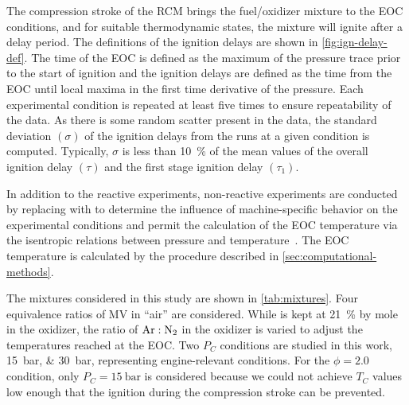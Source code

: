 \documentclass[letterpaper, review, sort&compress]{elsarticle}
\providecommand{\DIFadd}[1]{{\protect\color{blue}\uwave{#1}}} %
\providecommand{\DIFaddbegin}{} %
\providecommand{\DIFaddend}{} %
\newcommand{\DIFaddincludegraphics}[2][]{{\color{blue}\fbox{\DIFOincludegraphics[#1]{#2}}}} %
\DeclareRobustCommand{\DIFaddbegin}{\DIFOaddbegin \let\includegraphics\DIFaddincludegraphics} %
\DeclareRobustCommand{\DIFaddend}{\DIFOaddend \let\includegraphics\DIFOincludegraphics} %
\begin{document}
The compression stroke of the RCM brings the fuel/oxidizer mixture to the EOC conditions, and for
suitable thermodynamic states, the mixture will ignite after a delay period. The definitions of the
ignition delays are shown in \cref{fig:ign-delay-def}. The time of the EOC is defined as the maximum
of the pressure trace prior to the start of ignition and the ignition delays are defined as the time
from the EOC until local maxima in the first time derivative of the pressure. Each experimental
condition is repeated at least five times to ensure repeatability of the data. As there is some
random scatter present in the data, the standard deviation \((\sigma)\) of the ignition delays from
the runs at a given condition is computed. Typically, \(\sigma\) is less than \SI{10}{\percent} of
the mean values of the overall ignition delay \((\tau)\) and the first stage ignition delay
\((\tau_1)\).

In addition to the reactive experiments, non-reactive experiments are conducted by replacing 
with  to determine the influence of machine-specific behavior on the experimental conditions
\DIFaddbegin \DIFadd{(see \mbox{%
\cref{fig:ign-delay-def}}\hspace{0pt}%
) }\DIFaddend and permit the calculation of the EOC temperature via the isentropic
relations between pressure and temperature~\cite{Lee1998}. The EOC temperature is calculated by the
procedure described in \cref{sec:computational-methods}.

The mixtures considered in this study are shown in \cref{tab:mixtures}. Four equivalence ratios of
MV in ``air'' are considered. While  is kept at \SI{21}{\percent} by mole in the oxidizer,
the ratio of \(\ce{Ar}:\ce{N2}\) in the oxidizer is varied to adjust the temperatures reached at the
EOC. Two \(P_C\) conditions are studied in this work, \SIlist{15;30}{\bar}, representing
engine-relevant conditions. For the \(\phi=2.0\) condition, only \(P_C = \SI{15}{\bar}\) is
considered because we could not achieve \(T_C\) values low enough that the ignition during the
compression stroke can be prevented.
\end{document}
